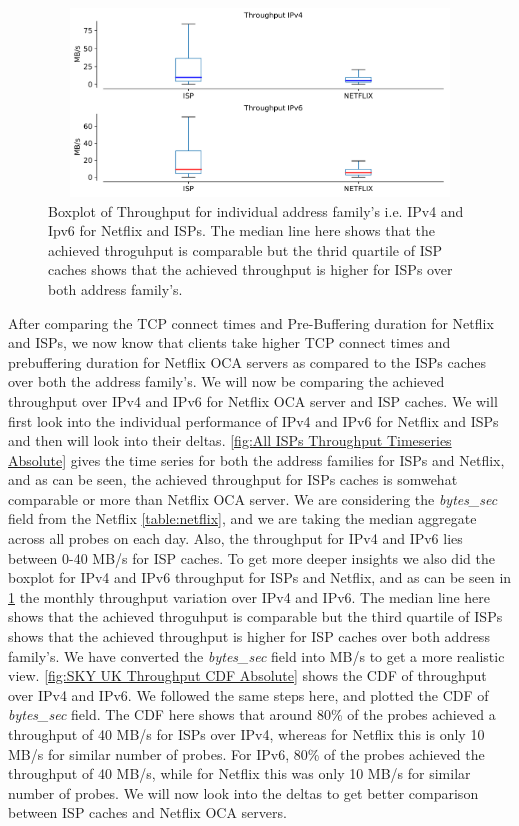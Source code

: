 \begin{figure}[!ht]
	\centering
	\includegraphics[keepaspectratio, height=5cm, width=15cm]{figures/cache/allisps/netflix-throughput-boxplot-all-isp-separate.pdf}
	\caption[All ISPs Throughput Boxplot Absolute]{Boxplot of Throughput for individual address family's i.e. IPv4 and Ipv6 for Netflix and ISPs. The median line here shows that the achieved throguhput is
	comparable but the thrid quartile of ISP caches shows that the achieved throughput is higher for ISPs over both address family's.}
	\label{fig:All ISPs Throughput Boxplot Absolute}
\end{figure}

After comparing the TCP connect times and Pre-Buffering duration for Netflix and ISPs, we now know that clients take higher TCP connect times and prebuffering duration
for Netflix OCA servers as compared to the ISPs caches over both the address family's. We will now be comparing the achieved throughput over IPv4 and IPv6 for Netflix OCA server and ISP caches.
We will first look into the individual performance of IPv4 and IPv6 for Netflix and ISPs and then will look into their deltas. \cref{fig:All ISPs Throughput Timeseries Absolute} gives the time series for
both the address families for ISPs and Netflix, and as can be seen, the achieved throughput for ISPs caches is somwehat comparable or more than Netflix OCA server.
We are considering the \textit{bytes\_sec} field from the Netflix \cref{table:netflix}, and we are taking the median aggregate across
all probes on each day. Also, the throughput for IPv4 and IPv6 lies between 0-40 MB/s for ISP caches. To get more deeper insights
we also did the boxplot for IPv4 and IPv6 throughput for ISPs and Netflix, and as can be seen in \cref{fig:All ISPs Throughput Boxplot Absolute} the monthly
throughput variation over IPv4 and IPv6. The median line here shows that the achieved throguhput is comparable but the third quartile of ISPs shows that the achieved throughput is higher for ISP caches over both address family's. We have 
converted the \textit{bytes\_sec} field into MB/s to get a more realistic view. \cref{fig:SKY UK Throughput CDF Absolute} shows the CDF of
throughput over IPv4 and IPv6. We followed the same steps here, and plotted the CDF of \textit{bytes\_sec} field. The CDF here shows that around 80\% of the probes achieved a throughput of 40 MB/s for ISPs over IPv4, whereas for Netflix this is only 10 MB/s
for similar number of probes. For IPv6, 80\% of the probes achieved the throughput of 40 MB/s, while for Netflix this was only 10 MB/s for similar number of probes. 
We will now look into the deltas to get better comparison between ISP caches and Netflix OCA servers.

